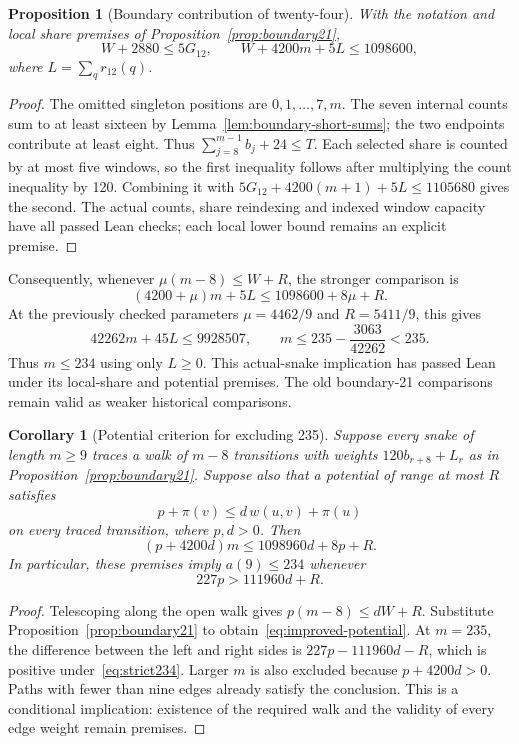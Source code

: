 \documentclass[11pt,a4paper]{article}
\newtheorem{proposition}[theorem]{Proposition}
\newtheorem{corollary}[theorem]{Corollary}
\theoremstyle{definition}
\theoremstyle{remark}
\begin{document}
\begin{proposition}[Boundary contribution of twenty-four]\label{prop:boundary24}
With the notation and local share premises of Proposition~\ref{prop:boundary21},
\[
\boxed{W+2880\le5G_{12},\qquad W+4200m+5L\le1098600,}
\]
where $L=\sum_qr_{12}(q)$.
\end{proposition}
\begin{proof}
The omitted singleton positions are $0,1,\ldots,7,m$. The seven internal
counts sum to at least sixteen by Lemma~\ref{lem:boundary-short-sums};
the two endpoints contribute at least eight. Thus
$\sum_{j=8}^{m-1}b_j+24\le T$.
Each selected share is counted by at most five windows, so the first
inequality follows after multiplying the count inequality by 120.
Combining it with $5G_{12}+4200(m+1)+5L\le1105680$ gives the second.
The actual counts, share reindexing and indexed window capacity have all
passed Lean checks; each local lower bound remains an explicit premise.
\end{proof}
Consequently, whenever $\mu(m-8)\le W+R$, the stronger comparison is
\begin{equation}\label{eq:boundary24-comparison}
\boxed{(4200+\mu)m+5L\le1098600+8\mu+R.}
\end{equation}
At the previously checked parameters $\mu=4462/9$ and $R=5411/9$,
this gives
\[
42262m+45L\le9928507,
\qquad m\le235-\frac{3063}{42262}<235.
\]
Thus $m\le234$ using only $L\ge0$. This actual-snake implication has
passed Lean under its local-share and potential premises. The old
boundary-21 comparisons remain valid as weaker historical comparisons.

\begin{corollary}[Potential criterion for excluding 235]\label{cor:potential234}
Suppose every snake of length $m\ge9$ traces a walk of $m-8$ transitions with weights $120b_{r+8}+L_r$ as in Proposition~\ref{prop:boundary21}. Suppose also that a potential of range at most $R$ satisfies
\[
p+\pi(v)\le d\,w(u,v)+\pi(u)
\]
on every traced transition, where $p,d>0$. Then
\begin{equation}\label{eq:improved-potential}
(p+4200d)m\le1098960d+8p+R.
\end{equation}
In particular, these premises imply $a(9)\le234$ whenever
\begin{equation}\label{eq:strict234}
227p>111960d+R.
\end{equation}
\end{corollary}
\begin{proof}
Telescoping along the open walk gives $p(m-8)\le dW+R$. Substitute Proposition~\ref{prop:boundary21} to obtain~\eqref{eq:improved-potential}. At $m=235$, the difference between the left and right sides is $227p-111960d-R$, which is positive under~\eqref{eq:strict234}. Larger $m$ is also excluded because $p+4200d>0$. Paths with fewer than nine edges already satisfy the conclusion. This is a conditional implication: existence of the required walk and the validity of every edge weight remain premises.
\end{proof}
\end{document}
